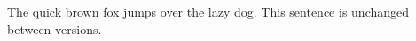 \documentclass{article}
\begin{document}
The quick brown fox jumps over the lazy dog.
This sentence is unchanged between versions.
\end{document}
